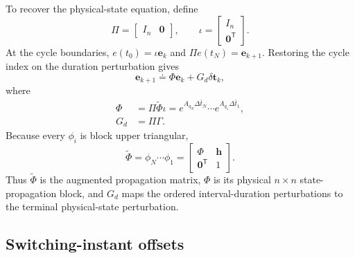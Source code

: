 \documentclass[pdflatex,iicol,sn-mathphys-ay]{sn-jnl}
\newcommand{\vect}[1]{\bm{#1}}
\begin{document}
To recover the physical-state equation, define
\begin{equation}
    \Pi=\begin{bmatrix}I_n&\vect{0}\end{bmatrix},
    \qquad
    \iota=\begin{bmatrix}I_n\\\vect{0}^{\mathsf T}\end{bmatrix}.
\end{equation}
At the cycle boundaries, $e(t_0)=\iota\vect{e}_k$ and $\Pi e(t_N)=\vect{e}_{k+1}$. Restoring the cycle index on the duration perturbation gives
\begin{equation}
    \vect{e}_{k+1}\doteq\Phi\vect{e}_k+G_d\delta\boldsymbol{t}_k,
    \label{eq:dwell-linearization}
\end{equation}
where
\begin{equation}
\begin{aligned}
    \Phi&=\Pi\widetilde\Phi\iota
    =e^{A_{q_N}\Delta\bar t_N}\cdots
      e^{A_{q_1}\Delta\bar t_1},\\
    G_d&=\Pi\Gamma.
\end{aligned}
\label{eq:physical-prediction-matrices}
\end{equation}
Because every $\phi_i$ is block upper triangular,
\begin{equation}
    \widetilde\Phi=\phi_N\cdots\phi_1
    =\begin{bmatrix}\Phi&\vect{h}\\
    \vect{0}^{\mathsf T}&1\end{bmatrix}.
    \label{eq:augmented-cycle-block-form}
\end{equation}
Thus $\widetilde\Phi$ is the augmented propagation matrix, $\Phi$ is its physical $n\times n$ state-propagation block, and $G_d$ maps the ordered interval-duration perturbations to the terminal physical-state perturbation.

\subsection{Switching-instant offsets}
\end{document}
